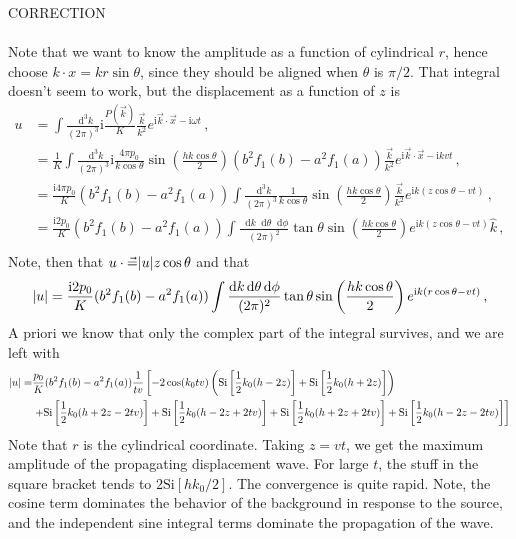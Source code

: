 \documentclass{article}
\newcommand*\diff{\mathop{}\!\mathrm{d}}
\newcommand*\te[1]{\text{#1}}
\newcommand*\p[1]{\left(#1\right)}
\newcommand*\ps[1]{\left[#1\right]}
\newcommand*\f[2]{\frac{#1}{#2}}
\newcommand*\I{\te{i}}
\begin{document}
CORRECTION
\\\\
Note that we want to know the amplitude as a function of cylindrical $r$, hence choose $k\cdot x = k r \sin\theta$, since they should be aligned when $\theta$ is $\pi/2$. That integral doesn't seem to work, but the displacement as a function of $z$ is
\begin{align}
u &= \int\f{\diff^3 k}{(2\pi)^3}\I\f{P(\vec k)}{K}\f{\vec k}{k^2}e^{\I \vec k\cdot\vec x - \I\omega t}\,,\\
&=\f{1}{K}\int\f{\diff^3 k}{(2\pi)^3}\I\f{4\pi p_0}{k\cos\theta}\sin\p{\f{h k\cos\theta}{2}}(b^2f_1(b)-a^2f_1(a))\f{\vec k}{k^2}e^{\I \vec k\cdot\vec x - \I k v t}\,,\\
&=\f{\I4\pi p_0}{K}(b^2f_1(b)-a^2f_1(a))\int\f{\diff^3 k}{(2\pi)^3}\f{1}{k\cos\theta}\sin\p{\f{h k\cos\theta}{2}}\f{\vec k}{k^2}e^{\I k(z\cos\theta -  v t)}\,,\\
&=\f{\I2 p_0}{K}(b^2f_1(b)-a^2f_1(a))\int\f{\diff k\diff\theta\diff\phi}{(2\pi)^2}\tan\theta\sin\p{\f{h k\cos\theta}{2}}e^{\I k(z\cos\theta -  v t)}\hat k\,,\\
\end{align}
Note, then that $u\cdot\vec  = \abs{u}z\cos\theta$ and that
\begin{align}
\abs{u}&=\f{\I2 p_0}{K}(b^2f_1(b)-a^2f_1(a))\int\f{\diff k\diff\theta\diff\phi}{(2\pi)^2}\tan\theta\sin\p{\f{h k\cos\theta}{2}}e^{\I k(r\cos\theta -  v t)}\,,\\
\end{align}
A priori we know that only the complex part of the integral survives, and we are left with
\begin{align}
\notag\abs{u} =& \f{ p_0}{K}(b^2f_1(b)-a^2f_1(a))\f{1}{tv}\ps{-2\cos(k_0 tv)\p{\te{Si}\ps{\f12 k_0(h - 2z)} + \te{Si}\ps{\f12 k_0(h + 2z)}}\right.\\&\left. + \te{Si} \ps{\f12 k_0(h+2z-2tv)}+ \te{Si}\ps{\f12 k_0(h-2z+2tv)}+\te{Si}\ps{\f12 k_0(h+2z+2tv)}+\te{Si}\ps{\f12 k_0(h-2z-2tv)}}
\end{align}
Note that $r$ is the cylindrical coordinate. Taking $z = vt$, we get the maximum amplitude of the propagating displacement wave. For large $t$, the stuff in the square bracket tends to $2\te{Si}\ps{h k_0/2}$. The convergence is quite rapid. Note, the cosine term dominates the behavior of the background in response to the source, and the independent sine integral terms dominate the propagation of the wave.
\pagebreak
\end{document}
